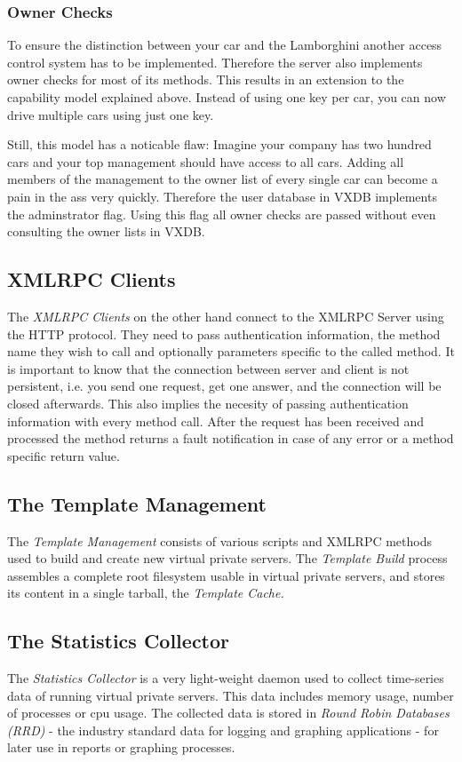 \subsubsection{Owner Checks}

To ensure the distinction between your car and the Lamborghini another access
control system has to be implemented. Therefore the server also implements
owner checks for most of its methods. This results in an extension to the
capability model explained above. Instead of using one key per car, you can now
drive multiple cars using just one key.

Still, this model has a noticable flaw: Imagine your company has two hundred
cars and your top management should have access to all cars. Adding all members
of the management to the owner list of every single car can become a pain in
the ass very quickly. Therefore the user database in VXDB implements the
adminstrator flag. Using this flag all owner checks are passed without even
consulting the owner lists in VXDB.


\subsection{XMLRPC Clients}

The \emph{XMLRPC Clients} on the other hand connect to the XMLRPC Server using
the HTTP protocol. They need to pass authentication information, the method
name they wish to call and optionally parameters specific to the called method.
It is important to know that the connection between server and client is not
persistent, i.e. you send one request, get one answer, and the connection will
be closed afterwards. This also implies the necesity of passing authentication
information with every method call. After the request has been received and
processed the method returns a fault notification in case of any error or a
method specific return value.


\subsection{The Template Management}

The \emph{Template Management} consists of various scripts and XMLRPC methods
used to build and create new virtual private servers. The \emph{Template Build}
process assembles a complete root filesystem usable in virtual private servers,
and stores its content in a single tarball, the \emph{Template Cache.}


\subsection{The Statistics Collector}

The \emph{Statistics Collector} is a very light-weight daemon used to collect
time-series data of running virtual private servers. This data includes memory
usage, number of processes or cpu usage. The collected data is stored in
\emph{Round Robin Databases (RRD)} - the industry standard data for logging and
graphing applications - for later use in reports or graphing processes.

